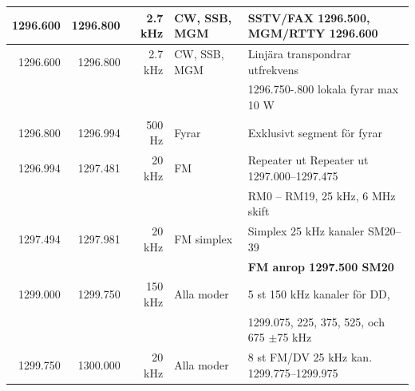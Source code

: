 {\begin{tabular}{rrrll}
	         1296.600 & 1296.800 &     2.7 kHz & CW, SSB, MGM    & SSTV/FAX 1296.500, MGM/RTTY 1296.600          \\ \hline
	         1296.600 & 1296.800 &     2.7 kHz & CW, SSB, MGM    & Linjära transpondrar utfrekvens               \\
	                  &          &             &                 & 1296.750-.800 lokala fyrar max 10 W           \\ \hline
	         1296.800 & 1296.994 &      500 Hz & Fyrar           & Exklusivt segment för fyrar                   \\ \hline
	         1296.994 & 1297.481 &      20 kHz & FM              & Repeater ut Repeater ut 1297.000--1297.475    \\
	                  &          &             &                 & RM0 – RM19, 25 kHz, 6 MHz skift               \\ \hline
	         1297.494 & 1297.981 &      20 kHz & FM simplex      & Simplex 25 kHz kanaler SM20--39               \\
	                  &          &             &                 & \textbf{FM anrop 1297.500 SM20}               \\ \hline
	         1299.000 & 1299.750 &     150 kHz & Alla moder      & 5 st 150 kHz kanaler för DD,                  \\
	                  &          &             &                 & 1299.075, 225, 375, 525, och 675 $\pm$75 kHz  \\ \hline
	         1299.750 & 1300.000 &      20 kHz & Alla moder      & 8 st FM/DV 25 kHz kan. 1299.775--1299.975
\end{tabular}}

\clearpage

